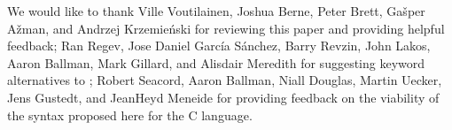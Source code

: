 We would like to thank Ville Voutilainen, Joshua Berne, Peter Brett, Ga\v sper A\v zman, and Andrzej Krzemie\' nski for reviewing this paper and providing helpful feedback; Ran Regev, Jose Daniel Garc\' ia S\' anchez, Barry Revzin, John Lakos, Aaron Ballman, Mark Gillard, and Alisdair Meredith for suggesting keyword alternatives to ; Robert Seacord, Aaron Ballman, Niall Douglas, Martin Uecker, Jens Gustedt, and JeanHeyd Meneide for providing feedback on the viability of the syntax proposed here for the C language.

\renewcommand{\addcontentsline}[3]{}%







